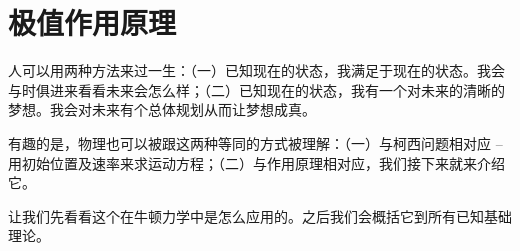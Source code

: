 \section{极值作用原理}

人可以用两种方法来过一生：（一）已知现在的状态，我满足于现在的状态。我会与时俱进来看看未来会怎么样；（二）已知现在的状态，我有一个对未来的清晰的梦想。我会对未来有个总体规划从而让梦想成真。

有趣的是，物理也可以被跟这两种等同的方式被理解：（一）与柯西问题相对应 -- 用初始位置及速率来求运动方程；（二）与作用原理相对应，我们接下来就来介绍它。


让我们先看看这个在牛顿力学中是怎么应用的。之后我们会概括它到所有已知基础理论。

